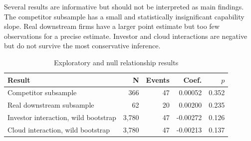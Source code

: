 \documentclass[12pt]{article}
\begin{document}
Several results are informative but should not be interpreted as main findings.
The competitor subsample has a small and statistically insignificant capability
slope. Real downstream firms have a larger point estimate but too few
observations for a precise estimate. Investor and cloud interactions are negative
but do not survive the most conservative inference.

\begin{table}[htbp]
\centering
\caption{Exploratory and null relationship results}
\label{tab:a_exploratory}
\begin{tabular}{lrrrr}
\toprule
Result & N & Events & Coef. & $p$ \\
\midrule
Competitor subsample & 366 & 47 & 0.00052 & 0.352 \\
Real downstream subsample & 62 & 20 & 0.00200 & 0.235 \\
Investor interaction, wild bootstrap & 3,780 & 47 & -0.00272 & 0.126 \\
Cloud interaction, wild bootstrap & 3,780 & 47 & -0.00213 & 0.137 \\
\bottomrule
\end{tabular}
\end{table}
\end{document}
